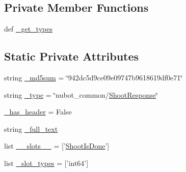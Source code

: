 \subsection*{Private Member Functions}
\begin{DoxyCompactItemize}
\item 
def \hyperlink{classnubot__common_1_1srv_1_1__Shoot_1_1ShootResponse_a9f415b9b4c01a1d3b701c3b0e6cd2b4e}{\-\_\-get\-\_\-types}
\end{DoxyCompactItemize}
\subsection*{Static Private Attributes}
\begin{DoxyCompactItemize}
\item 
string \hyperlink{classnubot__common_1_1srv_1_1__Shoot_1_1ShootResponse_a4c2c8be405618e95e7db5d258968f0f1}{\-\_\-md5sum} = \char`\"{}942dc5d9ce09e09747b9618619df0e71\char`\"{}
\item 
string \hyperlink{classnubot__common_1_1srv_1_1__Shoot_1_1ShootResponse_aa92cdf8de4ccfb83cebd0b0ccda0f344}{\-\_\-type} = \char`\"{}nubot\-\_\-common/\hyperlink{classnubot__common_1_1srv_1_1__Shoot_1_1ShootResponse}{Shoot\-Response}\char`\"{}
\item 
\hyperlink{classnubot__common_1_1srv_1_1__Shoot_1_1ShootResponse_a3148bc4579ccd2423ef8e67fd71e77a5}{\-\_\-has\-\_\-header} = False
\item 
string \hyperlink{classnubot__common_1_1srv_1_1__Shoot_1_1ShootResponse_ad08a69928f6301cfe2b7b7e8055f1e87}{\-\_\-full\-\_\-text}
\item 
list \hyperlink{classnubot__common_1_1srv_1_1__Shoot_1_1ShootResponse_ae0dc076f7ec32b740d3f9137ba38e3c7}{\-\_\-\-\_\-slots\-\_\-\-\_\-} = \mbox{[}'\hyperlink{classnubot__common_1_1srv_1_1__Shoot_1_1ShootResponse_ae79abbfb6fdf49f5de0576d84a1125b4}{Shoot\-Is\-Done}'\mbox{]}
\item 
list \hyperlink{classnubot__common_1_1srv_1_1__Shoot_1_1ShootResponse_ad966a24331f6747a16acc8a42b589195}{\-\_\-slot\-\_\-types} = \mbox{[}'int64'\mbox{]}
\end{DoxyCompactItemize}


